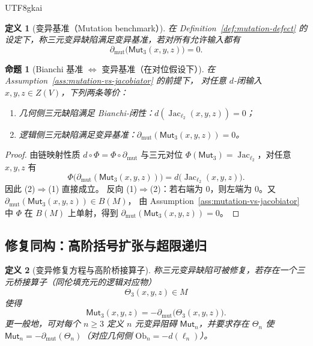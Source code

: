 \documentclass[12pt]{article}
\newtheorem{definition}{定义}[section]
\newtheorem{proposition}{命题}[section]
\newcommand{\Layer}{\ensuremath{\ell}}
\newcommand{\Jac}{\operatorname{Jac}}
\newcommand{\Ob}{\mathrm{Ob}}
\begin{document}
\begin{CJK*}{UTF8}{gkai}
\begin{definition}[变异基准（Mutation benchmark）]
\label{def:mutation-benchmark}
在 Definition~\ref{def:mutation-defect} 的设定下，称三元变异缺陷满足\emph{变异基准}，若对所有允许输入都有
\[
  \partial_{\mathrm{mut}}\bigl(\mathsf{Mut}_3(x,y,z)\bigr)=0.
\]
\end{definition}

\begin{proposition}[Bianchi 基准 $\Longleftrightarrow$ 变异基准（在对位假设下）]
\label{prop:bianchi-implies-mutation-benchmark}
在 Assumption~\ref{ass:mutation-vs-jacobiator} 的前提下，
对任意 $d$-闭输入 $x,y,z\in Z(V)$，下列两条等价：
\begin{enumerate}
  \item 几何侧三元缺陷满足 Bianchi-闭性：$d(\Jac_{\Layer_2}(x,y,z))=0$；
  \item 逻辑侧三元缺陷满足变异基准：$\partial_{\mathrm{mut}}(\mathsf{Mut}_3(x,y,z))=0$。
\end{enumerate}
\end{proposition}

\begin{proof}
由链映射性质 $d\circ\Phi=\Phi\circ \partial_{\mathrm{mut}}$ 与三元对位
$\Phi(\mathsf{Mut}_3)=\Jac_{\Layer_2}$，对任意 $x,y,z$ 有
\[
  \Phi\bigl(\partial_{\mathrm{mut}}(\mathsf{Mut}_3(x,y,z))\bigr)
  =
  d\bigl(\Jac_{\Layer_2}(x,y,z)\bigr).
\]
因此 (2)$\Rightarrow$(1) 直接成立。
反向 (1)$\Rightarrow$(2)：若右端为 $0$，则左端为 $0$。又
$\partial_{\mathrm{mut}}(\mathsf{Mut}_3(x,y,z))\in B(M)$，
由 Assumption~\ref{ass:mutation-vs-jacobiator} 中 $\Phi$ 在 $B(M)$ 上单射，得到
$\partial_{\mathrm{mut}}(\mathsf{Mut}_3(x,y,z))=0$。
\end{proof}

\subsection{修复同构：高阶括号扩张与超限递归}

\begin{definition}[变异修复方程与高阶桥接算子]
\label{def:mutation-repair-equation}
称三元变异缺陷可被\emph{修复}，若存在一个三元桥接算子（同伦填充元的逻辑对应物）
\[
  \Theta_3(x,y,z)\in M
\]
使得
\[
  \mathsf{Mut}_3(x,y,z) = -\partial_{\mathrm{mut}}\bigl(\Theta_3(x,y,z)\bigr).
\]
更一般地，可对每个 $n\ge 3$ 定义 $n$ 元变异阻碍 $\mathsf{Mut}_n$，并要求存在 $\Theta_n$ 使
$\mathsf{Mut}_n=-\partial_{\mathrm{mut}}(\Theta_n)$（对应几何侧 $\Ob_n=-d(\Layer_n)$）。
\end{definition}


\end{CJK*}
\end{document}
